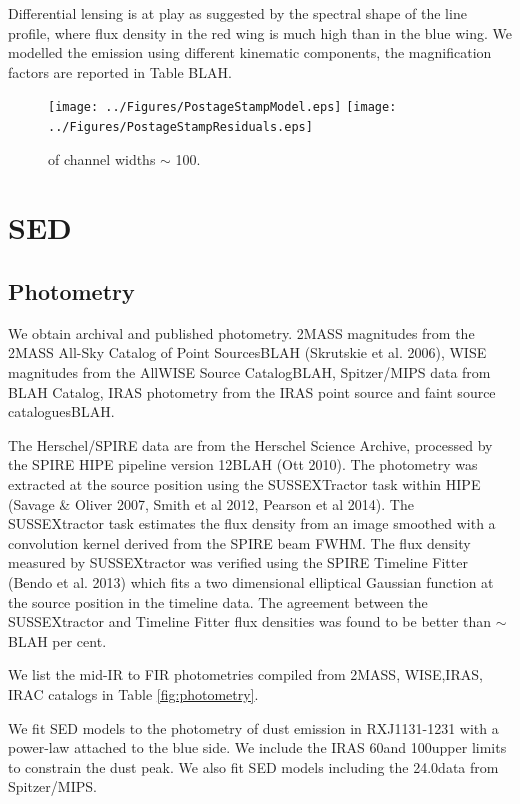 \documentclass[]{emulateapj}
\begin{document}
Differential lensing is at play as suggested by the spectral shape of the  line profile, where
flux density in the red wing is much high than in the blue wing.
We modelled the emission using different kinematic components, the magnification factors are reported in Table BLAH.



\begin{figure}[tbph]
\centering
\texttt{[image: ../Figures/PostageStampModel.eps]}
\texttt{[image: ../Figures/PostageStampResiduals.eps]}
\caption{
of channel widths $\sim$ 100\kms.
\label{fig:}}
\end{figure}


\section{SED}

\subsection{Photometry}

We obtain archival and published photometry.
2MASS magnitudes from the 2MASS All-Sky
Catalog of Point SourcesBLAH  (Skrutskie et al. 2006), WISE magnitudes
from the AllWISE Source CatalogBLAH, Spitzer/MIPS
data from BLAH Catalog, IRAS photometry from the IRAS point source
and faint source cataloguesBLAH.

The Herschel/SPIRE data are from the Herschel Science Archive, processed
by the SPIRE HIPE pipeline version 12BLAH (Ott 2010). The
photometry was extracted at the source position using the
SUSSEXTractor task within HIPE (Savage \& Oliver 2007,
Smith et al 2012, Pearson et al 2014). The SUSSEXtractor
task estimates the flux density from an image smoothed with
a convolution kernel derived from the SPIRE beam FWHM.
The flux density measured by SUSSEXtractor
was verified using the SPIRE Timeline Fitter (Bendo et
al. 2013) which fits a two dimensional elliptical Gaussian
function at the source position in the timeline data. The
agreement between the SUSSEXtractor and Timeline Fitter
flux densities was found to be better than $\sim$BLAH per cent.

We list the mid-IR to FIR photometries compiled from 2MASS, WISE,IRAS, IRAC catalogs in Table \ref{fig:photometry}.

We fit SED models to the photometry of dust emission in RXJ1131-1231 with a power-law attached to the blue side.
We include the IRAS 60\micron and 100\micron upper limits to constrain the dust peak.
We also fit SED models including the 24.0\micron data from Spitzer/MIPS. 
\end{document}
